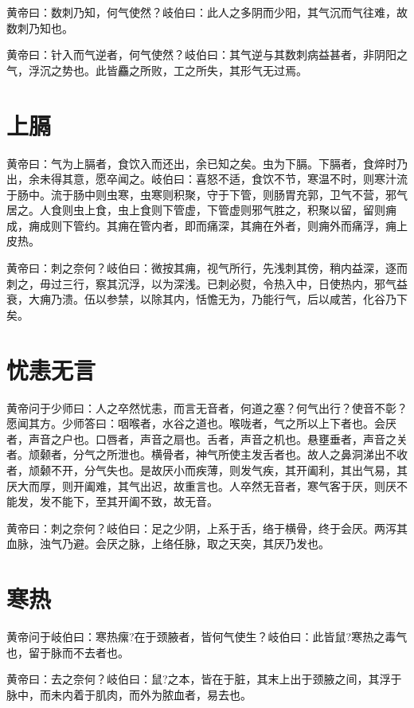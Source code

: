 \documentclass[a4paper,12pt,UTF8,twoside]{ctexbook}
\begin{document}
	黄帝曰：数刺乃知，何气使然？岐伯曰：此人之多阴而少阳，其气沉而气往难，故数刺乃知也。
	
	黄帝曰：针入而气逆者，何气使然？岐伯曰：其气逆与其数刺病益甚者，非阴阳之气，浮沉之势也。此皆麤之所败，工之所失，其形气无过焉。
	
	\chapter{上膈}
		
	黄帝曰：气为上膈者，食饮入而还出，余已知之矣。虫为下膈。下膈者，食焠时乃出，余未得其意，愿卒闻之。岐伯曰：喜怒不适，食饮不节，寒温不时，则寒汁流于肠中。流于肠中则虫寒，虫寒则积聚，守于下管，则肠胃充郭，卫气不营，邪气居之。人食则虫上食，虫上食则下管虚，下管虚则邪气胜之，积聚以留，留则痈成，痈成则下管约。其痈在管内者，即而痛深，其痈在外者，则痈外而痛浮，痈上皮热。
	
	黄帝曰：刺之奈何？岐伯曰：微按其痈，视气所行，先浅刺其傍，稍内益深，逐而刺之，毋过三行，察其沉浮，以为深浅。已刺必熨，令热入中，日使热内，邪气益衰，大痈乃溃。伍以参禁，以除其内，恬憺无为，乃能行气，后以咸苦，化谷乃下矣。
	
	\chapter{忧恚无言}
	
	黄帝问于少师曰：人之卒然忧恚，而言无音者，何道之塞？何气出行？使音不彰？愿闻其方。少师答曰：咽喉者，水谷之道也。喉咙者，气之所以上下者也。会厌者，声音之户也。口唇者，声音之扇也。舌者，声音之机也。悬壅垂者，声音之关者。颃颡者，分气之所泄也。横骨者，神气所使主发舌者也。故人之鼻洞涕出不收者，颃颡不开，分气失也。是故厌小而疾薄，则发气疾，其开阖利，其出气易，其厌大而厚，则开阖难，其气出迟，故重言也。人卒然无音者，寒气客于厌，则厌不能发，发不能下，至其开阖不致，故无音。
	
	黄帝曰：刺之奈何？岐伯曰：足之少阴，上系于舌，络于横骨，终于会厌。两泻其血脉，浊气乃避。会厌之脉，上络任脉，取之天突，其厌乃发也。
	
	\chapter{寒热}
	
	黄帝问于岐伯曰：寒热瘰?在于颈腋者，皆何气使生？岐伯曰：此皆鼠?寒热之毒气也，留于脉而不去者也。
	
	黄帝曰：去之奈何？岐伯曰：鼠?之本，皆在于脏，其末上出于颈腋之间，其浮于脉中，而未内着于肌肉，而外为脓血者，易去也。
	
\end{document}
